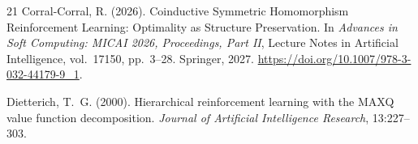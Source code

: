 \documentclass[9pt,a4paper]{article}
\theoremstyle{plain}
\theoremstyle{definition}
\theoremstyle{remark}
\begin{document}
\begin{thebibliography}{21}
Corral-Corral, R. (2026).
Coinductive Symmetric Homomorphism Reinforcement Learning: Optimality as Structure Preservation.
In \textit{Advances in Soft Computing: MICAI 2026, Proceedings, Part II}, Lecture Notes in Artificial Intelligence, vol.~17150, pp.~3--28. Springer, 2027. \url{https://doi.org/10.1007/978-3-032-44179-9_1}.

Dietterich, T.~G. (2000).
Hierarchical reinforcement learning with the MAXQ value function decomposition.
\textit{Journal of Artificial Intelligence Research}, 13:227--303.

\end{thebibliography}
\end{document}
